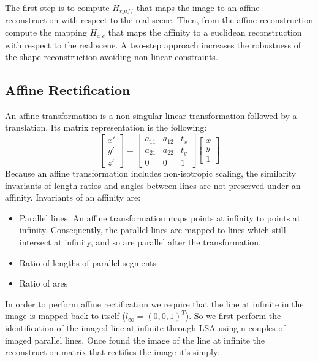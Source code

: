 \documentclass[11pt, oneside]{article}   	%
\begin{document}
The first step is to compute $H_{r\_aff}$ that maps the image to an affine reconstruction with respect to the real scene. Then, from the affine reconstruction compute the mapping $H_{a\_e}$ that maps the affinity to a euclidean reconstruction with respect to the real scene. A two-step approach increases the robustness of the shape reconstruction avoiding non-linear constraints. 

\subsection{Affine Rectification}
An affine transformation is a non-singular linear transformation followed by a translation.
Its matrix representation is the following:
\begin{equation}
\begin{bmatrix}
x' \\ y' \\ z' 
\end{bmatrix}
= 
\begin{bmatrix}
a_{11} & a_{12} & t_x \\ a_{21} & a_{22} & t_y  \\ 0 & 0 & 1
\end{bmatrix}
\begin{bmatrix}
x \\ y \\ 1
\end{bmatrix}
\end{equation}
Because an affine transformation includes non-isotropic scaling, the similarity invariants of length ratios and angles between lines are not preserved under an affinity.
Invariants of an affinity are:
\begin{itemize}
\item Parallel lines. An affine transformation maps points at infinity to points  at infinity. Consequently, the parallel lines are mapped to lines which still intersect at infinity, and so are parallel after the transformation.
\item Ratio of lengths of parallel segments
\item Ratio of ares
\end{itemize}

In order to perform affine rectification we require that the line at infinite in the image is mapped back to itself ($l_{\infty} = (0,0,1)^{T}$).
So we first perform the identification of the imaged line at infinite through LSA using n couples of imaged parallel lines. 
Once found the image of the line at infinite the reconstruction matrix that rectifies the image it's simply:
\end{document}
